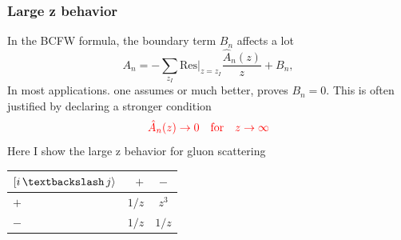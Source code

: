 \documentclass{beamer}
\begin{document}
\begin{frame}
    \frametitle{Large z behavior}
    In the BCFW formula, the boundary term $B_n$ affects a lot
    \begin{equation*}
        A_n=-\sum_{z_I}\mathrm{Res}|_{z=z_I}\frac{\hat{A}_n(z)}{z}+B_n,
    \end{equation*}
    In most applications. one assumes or much better, proves $B_n=0$. This is often justified by declaring a stronger condition
    \begin{equation*}
        \textcolor{red}{\hat{A}_n(z)\rightarrow 0 \quad \text{for} \quad z\rightarrow \infty} 
    \end{equation*}
    Here I show the large z behavior for gluon scattering 
    \begin{center}
        \begin{tabular}{lrc}
            \toprule
            $[i\, \textbackslash \, j\rangle $ & $+$ & $-$ \\
            \midrule
            $+$ & $1/z$ & $z^3$ \\
            $-$ & $1/z$ & $1/z$ \\
            \bottomrule
          \end{tabular}
    \end{center}
    
      
\end{frame}
\end{document}
